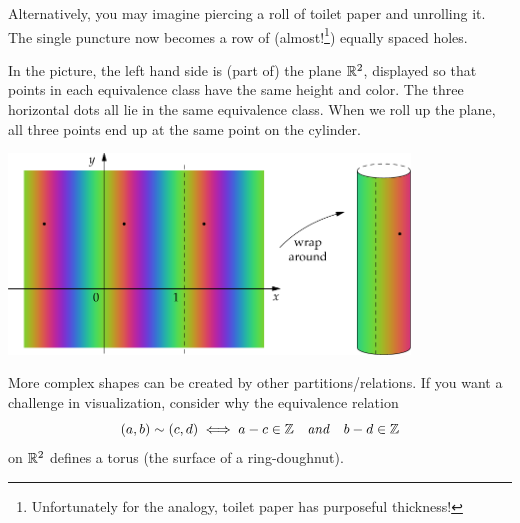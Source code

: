 Alternatively, you may imagine piercing a roll of toilet paper and unrolling it. The single puncture now becomes a row of (almost!\footnote{Unfortunately for the analogy, toilet paper has purposeful thickness!}) equally spaced holes.\par

In the picture, the left hand side is (part of) the plane $\mathbb{R}^2$, displayed so that points in each equivalence class have the same height and color. The three horizontal dots all lie in the same equivalence class. When we roll up the plane, all three points end up at the same point on the cylinder.

\begin{center}
	\includegraphics[width=0.8\textwidth]{relations-13-cylinder}
\end{center}

More complex shapes can be created by other partitions/relations. If you want a challenge in visualization, consider why the equivalence relation
\[
	(a,b)\sim (c,d)\iff a-c\in\mathbb{Z}\quad\text{\emph{and}}\quad b-d\in\mathbb{Z}
\]
on $\mathbb{R}^2$ defines a torus (the surface of a ring-doughnut).

% 


